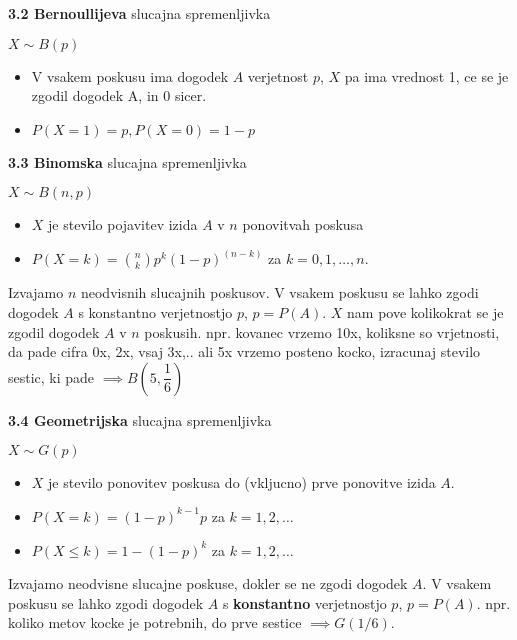 \documentclass{article}
\begin{document}
\begin{multicols}{3}
	\textbf{3.2 Bernoullijeva} slucajna spremenljivka
	\begin{center}
		\begin{math}
			X \sim B(p)
		\end{math}
	\end{center}
	\begin{itemize}
		\item V vsakem poskusu ima dogodek $A$ verjetnost $p$, $X$ pa ima vrednost 1, ce se je zgodil dogodek A, in 0 sicer.
		\item $P(X = 1) = p, P(X = 0) = 1 - p$
	\end{itemize}


	\textbf{3.3 Binomska} slucajna spremenljivka
	\begin{center}
		\begin{math}
			X \sim B(n, p)
		\end{math}
	\end{center}
	\begin{itemize}
		\item $X$ je stevilo pojavitev izida $A$ v $n$ ponovitvah poskusa
		\item $P(X = k) = {n \choose k} p^{k} (1 - p)^{(n - k)}$ za $k = 0,1, \dots, n.$
	\end{itemize}
	Izvajamo $n$ neodvisnih slucajnih poskusov. V vsakem poskusu se lahko zgodi dogodek $A$ s
	konstantno verjetnostjo $p$, $p =  P(A)$.
	$X$ nam pove kolikokrat se je zgodil dogodek $A$ v $n$ poskusih.
	npr. kovanec vrzemo 10x, koliksne so vrjetnosti, da pade cifra 0x, 2x, vsaj 3x,..
	ali 5x vrzemo posteno kocko, izracunaj stevilo sestic, ki pade $\implies B(5, \dfrac{1}{6})$

	\textbf{3.4 Geometrijska} slucajna spremenljivka
	\begin{center}
		\begin{math}
			X \sim G(p)
		\end{math}
	\end{center}
	\begin{itemize}
		\item $X$ je stevilo ponovitev poskusa do (vkljucno) prve ponovitve izida $A$.
		\item $P(X = k) = (1 - p)^{k - 1} p$ za $k = 1,2, \dots$
		\item $P(X \leq k) = 1 - (1 - p)^{k}$ za $k = 1,2, \dots$
	\end{itemize}
	Izvajamo  neodvisne slucajne poskuse, dokler se ne zgodi dogodek $A$. V vsakem poskusu
	se lahko zgodi dogodek $A$  s \textbf{konstantno} verjetnostjo $p$, $p =  P(A)$.
	npr. koliko metov kocke je potrebnih, do prve sestice $\implies G(1/6)$.


\end{multicols}
\end{document}
